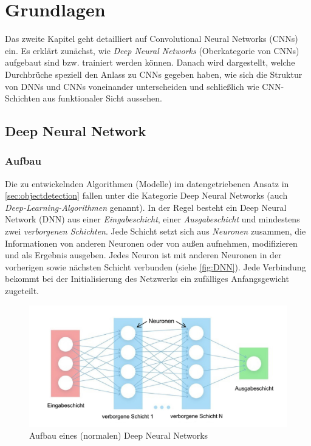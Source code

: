 \chapter{Grundlagen} \label{chap:grundlagen}

Das zweite Kapitel geht detailliert auf Convolutional Neural Networks (CNNs) ein. Es erklärt zunächst, wie \emph{Deep Neural Networks} (Oberkategorie von CNNs) aufgebaut sind bzw. trainiert werden können. Danach wird dargestellt, welche Durchbrüche speziell den Anlass zu CNNs gegeben haben, wie sich die Struktur von DNNs und CNNs voneinander unterscheiden und schließlich wie CNN-Schichten aus funktionaler Sicht aussehen.

\section{Deep Neural Network}

\subsection{Aufbau}

Die zu entwickelnden Algorithmen (Modelle) im datengetriebenen Ansatz in \autoref{sec:objectdetection} fallen unter die Kategorie Deep Neural Networks (auch \emph{Deep-Learning-Algorithmen} genannt). In der Regel besteht ein Deep Neural Network (DNN) aus einer \emph{Eingabeschicht}, einer \emph{Ausgabeschicht} und mindestens zwei \emph{verborgenen Schichten}. Jede Schicht setzt sich aus \emph{Neuronen} zusammen, die Informationen von anderen Neuronen oder von außen aufnehmen, modifizieren und als Ergebnis ausgeben. Jedes Neuron ist mit anderen Neuronen in der vorherigen sowie nächsten Schicht verbunden (siehe \autoref{fig:DNN}). Jede Verbindung bekommt bei der Initialisierung des Netzwerks ein zufälliges Anfangsgewicht zugeteilt.

\begin{figure}[!hb]
	\centering
	\includegraphics[width=\linewidth]{images/DNN}
	\caption{Aufbau eines (normalen) Deep Neural Networks \protect\cite{AufbauDNN}}
	\label{fig:DNN}
\end{figure}

